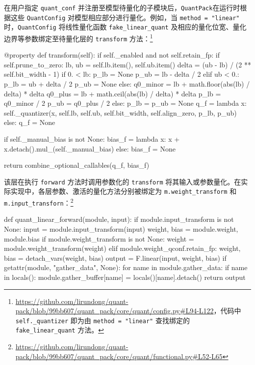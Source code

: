 \documentclass[
  fontset = source,
]{shtthesis}
\providecommand{\QP}{\texttt{QuantPack}}
\begin{document}
在用户指定 \verb|quant_conf| 并注册至模型待量化的子模块后，\QP 在运行时根据这些 \verb|QuantConfig| 对模型相应部分进行量化。例如，当 \texttt{method = "linear"} 时，\verb|QuantConfig| 将线性量化函数 \verb|fake_linear_quant| 及相应的量化位宽、量化边界等参数绑定至待量化层的 \verb|transform| 方法：\footnote{\url{https://github.com/lirundong/quant-pack/blob/99bb607/quant_pack/core/quant/config.py\#L94-L122}，代码中 \texttt{self.\_quantizer} 即为由 \texttt{method = "linear"} 查找绑定的 \texttt{fake\_linear\_quant} 方法。}
\begin{python}
@property
def transform(self):
    if self._enabled and not self.retain_fp:
        if self.prune_to_zero:
            lb, ub = self.lb.item(), self.ub.item()
            delta = (ub - lb) / (2 ** self.bit_width - 1)
            if 0. < lb:
                p_lb = None
                p_ub = lb - delta / 2
            elif ub < 0.:
                p_lb = ub + delta / 2
                p_ub = None
            else:
                q0_minor = lb + math.floor(abs(lb) / delta) * delta
                q0_plus = lb + math.ceil(abs(lb) / delta) * delta
                p_lb = q0_minor / 2
                p_ub = q0_plus / 2
        else:
            p_lb = p_ub = None
        q_f = lambda x: self._quantizer(x, self.lb, self.ub, self.bit_width, self.align_zero, p_lb, p_ub)
    else:
        q_f = None

    if self._manual_bias is not None:
        bias_f = lambda x: x + x.detach().mul_(self._manual_bias)
    else:
        bias_f = None

    return combine_optional_callables(q_f, bias_f)
\end{python}
该层在执行 \verb|forward| 方法时调用参数化的 \verb|transform| 将其输入或参数量化。在实际实现中，各层参数、激活的量化方法分别被绑定为 \verb|m.weight_transform| 和 \verb|m.input_transforn|：\footnote{\url{https://github.com/lirundong/quant-pack/blob/99bb607/quant_pack/core/quant/functional.py\#L52-L65}}
\begin{python}
def quant_linear_forward(module, input):
    if module.input_transform is not None:
        input = module.input_transform(input)
    weight, bias = module.weight, module.bias
    if module.weight_transform is not None:
        weight = module.weight_transform(weight)
    elif module.weight_qconf.retain_fp:
        weight, bias = detach_vars(weight, bias)
    output = F.linear(input, weight, bias)
    if getattr(module, "gather_data", None):
        for name in module.gather_data:
            if name in locals():
                module.gather_buffer[name] = locals()[name].detach()
    return output
\end{python}
\end{document}
